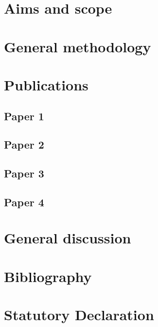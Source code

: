 \documentclass[12pt]{report}
\begin{document}
    \chapter{Aims and scope}

    \chapter{General methodology}

    \chapter{Publications}
        \section{Paper 1}
        
        \section{Paper 2}

        \section{Paper 3}

        \section{Paper 4}

    \chapter{General discussion}

    \chapter{Bibliography}

    \chapter{Statutory Declaration}
\end{document}
